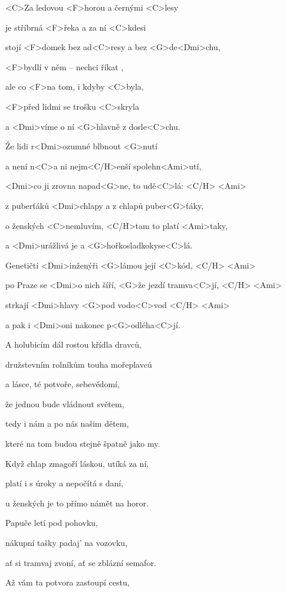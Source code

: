 

\zs
<C>Za ledovou <F>horou a černými <C>lesy

je stříbrná <F>řeka a za ní <C>kdesi

stojí <F>domek bez ad<C>resy a bez <G>de<Dmi>chu,

<F>bydlí v něm -- nechci říkat ,

ale co <F>na tom, i kdyby <C>byla,

<F>před lidmi se trošku <C>skryla

a <Dmi>víme o ní <G>hlavně z dosle<C>chu.
\ks

\zr
Že lidi r<Dmi>ozumné blbnout <G>nutí

a není n<C>a ni nejm<C/H>enší spolehn<Ami>utí,

<Dmi>co ji zrovna napad<G>ne, to udě<C>lá: <C/H> <Ami>

z puberťáků <Dmi>chlapy a z chlapů puber<G>ťáky,

o ženských <C>nemluvím, <C/H>tam to platí <Ami>taky,

a <Dmi>urážlivá je a <G>hořkosladkokyse<C>lá.
\kr

\zs
Genetičtí <Dmi>inženýři <G>lámou její <C>kód, <C/H> <Ami>

po Praze se <Dmi>o nich šíří, <G>že jezdí tramva<C>jí, <C/H> <Ami>

strkají <Dmi>hlavy <G>pod vodo<C>vod <C/H> <Ami>

a pak i <Dmi>oni nakonec p<G>odléha<C>jí.
\ks

\zr
A holubicím dál rostou křídla dravců,

družstevním rolníkům touha mořeplavců

a lásce, té potvoře, sebevědomí,

že jednou bude vládnout světem,

tedy i nám a po nás našim dětem,

které na tom budou stejně špatně jako my.
\kr

\zr
Když chlap zmagoří láskou, utíká za ní,

platí i s úroky a nepočítá s daní,

u ženských je to přímo námět na horor.

Papuče letí pod pohovku,

nákupní tašky padaj' na vozovku,

ať si tramvaj zvoní, ať se zblázní semafor.
\kr

\zs
Až vám ta potvora zastoupí cestu,

